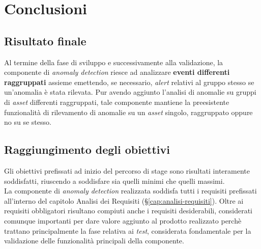 
\chapter{Conclusioni}
\label{cap:conclusioni}


\section{Risultato finale}
Al termine della fase di sviluppo e successivamente alla validazione, la componente di \textit{anomaly detection} riesce ad analizzare \textbf{eventi differenti raggruppati} assieme emettendo, se necessario, \textit{alert} relativi al gruppo stesso se un'anomalia è stata rilevata. Pur avendo aggiunto l'analisi di anomalie su gruppi di \textit{asset} differenti raggruppati, tale componente mantiene la preesistente funzionalità di rilevamento di anomalie su un \textit{asset} singolo, raggruppato oppure no su se stesso.

\section{Raggiungimento degli obiettivi}
Gli obiettivi prefissati ad inizio del percorso di stage sono risultati interamente soddisfatti, riuscendo a soddisfare sia quelli minimi che quelli massimi.\\
La componente di \textit{anomaly detection} realizzata soddisfa tutti i requisiti prefissati all'interno del capitolo Analisi dei Requisiti (\S\ref{cap:analisi-requisiti}). Oltre ai requisiti obbligatori risultano compiuti anche i requisiti desiderabili, considerati comunque importanti per dare valore aggiunto al prodotto realizzato perchè trattano principalmente la fase relativa ai \textit{test}, considerata fondamentale per la validazione delle funzionalità principali della componente.

